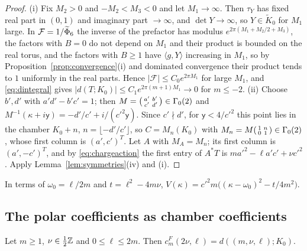 \begin{proof}
(i) Fix $M_2>0$ and $-M_2<M_3<0$ and let $M_1\to\infty$. Then $\tau_Y$ has fixed real part in $(0,1)$ and imaginary part $\to\infty$, and $\det Y\to\infty$, so $Y\in\tilde K_0$ for $M_1$ large. In $\mathcal F=1/\widetilde\Phi_6$ the inverse of the prefactor has modulus $e^{2\pi(M_1+M_2/2+M_3)}$, the factors with $B=0$ do not depend on $M_1$ and their product is bounded on the real torus, and the factors with $B\ge1$ have $\langle g,Y\rangle$ increasing in $M_1$, so by Proposition~\ref{prop:convergence}(i) and dominated convergence their product tends to $1$ uniformly in the real parts. Hence $|\mathcal F|\le C_0e^{2\pi M_1}$ for large $M_1$, and \eqref{eq:dintegral} gives $|d(T;K_0)|\le C_1e^{2\pi(m+1)M_1}\to0$ for $m\le-2$.
(ii) Choose $b',d'$ with $a'd'-b'c'=1$; then $M=\begin{psmallmatrix}a'&b'\\c'&d'\end{psmallmatrix}\in\Gamma_0(2)$ and $M^{-1}(\kappa+i\mathsf y)=-d'/c'+i/(c'^2\mathsf y)$. Since $c'\nmid d'$, for $\mathsf y<4/c'^2$ this point lies in the chamber $K_0+n$, $n=\lfloor-d'/c'\rfloor$, so $C=M_n(K_0)$ with $M_n=M\begin{psmallmatrix}1&n\\0&1\end{psmallmatrix}\in\Gamma_0(2)$, whose first column is $(a',c')^T$. Let $A$ with $M_A=M_n$; its first column is $(a',-c')^T$, and by \eqref{eq:chargeaction} the first entry of $A^\ast T$ is $ma'^2-\ell a'c'+\nu c'^2$. Apply Lemma~\ref{lem:symmetries}(iv) and (i).
\end{proof}

In terms of $\omega_0=\ell/2m$ and $t=\ell^2-4m\nu$, $V(\kappa)=c'^2m\big((\kappa-\omega_0)^2-t/4m^2\big)$.

\subsection{The polar coefficients as chamber coefficients}

\begin{proposition}\label{prop:identification}
Let $m\ge1$, $\nu\in\frac12\mathbb{Z}$ and $0\le\ell\le2m$. Then $c^F_m(2\nu,\ell)=d((m,\nu,\ell);K_0)$.
\end{proposition}


